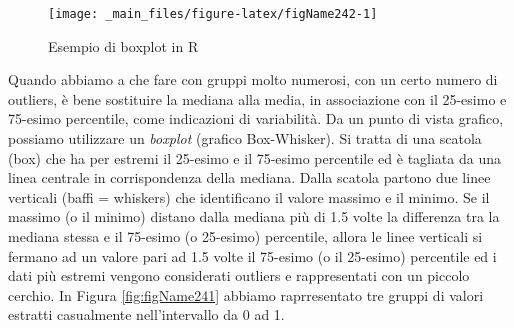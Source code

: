 \documentclass[a4paper,12pt,oneside]{book}
\newenvironment{Shaded}{\begin{snugshade}}{\end{snugshade}}
\newcommand{\DecValTok}[1]{#1}
\newcommand{\FloatTok}[1]{#1}
\newcommand{\SpecialCharTok}[1]{#1}
\newcommand{\OtherTok}[1]{#1}
\newcommand{\FunctionTok}[1]{#1}
\newcommand{\AttributeTok}[1]{#1}
\newcommand{\NormalTok}[1]{#1}
\begin{document}
\begin{Shaded}
\end{Shaded}

\begin{figure}

{\centering \texttt{[image: \_main\_files/figure-latex/figName242-1]} 

}

\caption{Esempio di boxplot in R}\label{fig:figName242}
\end{figure}

Quando abbiamo a che fare con gruppi molto numerosi, con un certo numero di outliers, è bene sostituire la mediana alla media, in associazione con il 25-esimo e 75-esimo percentile, come indicazioni di variabilità. Da un punto di vista grafico, possiamo utilizzare un \emph{boxplot} (grafico Box-Whisker). Si tratta di una scatola (box) che ha per estremi il 25-esimo e il 75-esimo percentile ed è tagliata da una linea centrale in corrispondenza della mediana. Dalla scatola partono due linee verticali (baffi = whiskers) che identificano il valore massimo e il minimo. Se il massimo (o il minimo) distano dalla mediana più di 1.5 volte la differenza tra la mediana stessa e il 75-esimo (o 25-esimo) percentile, allora le linee verticali si fermano ad un valore pari ad 1.5 volte il 75-esimo (o il 25-esimo) percentile ed i dati più estremi vengono considerati outliers e rappresentati con un piccolo cerchio. In Figura \ref{fig:figName241} abbiamo raprresentato tre gruppi di valori estratti casualmente nell'intervallo da 0 ad 1.
\end{document}
